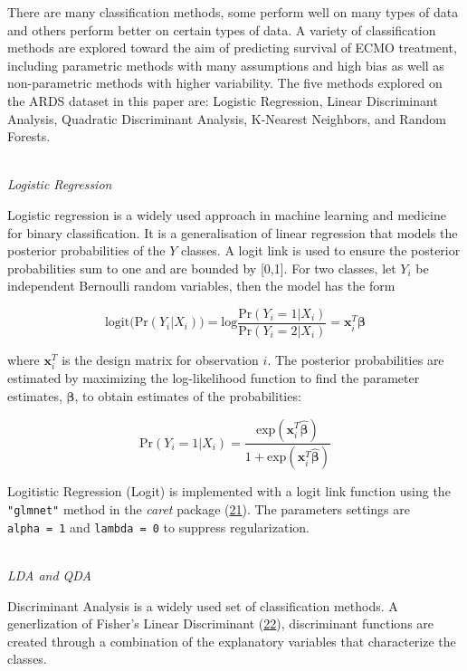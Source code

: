 \documentclass[12pt,]{article}
\begin{document}
There are many classification methods, some perform well on many types
of data and others perform better on certain types of data. A variety of
classification methods are explored toward the aim of predicting
survival of ECMO treatment, including parametric methods with many
assumptions and high bias as well as non-parametric methods with higher
variability. The five methods explored on the ARDS dataset in this paper
are: Logistic Regression, Linear Discriminant Analysis, Quadratic
Discriminant Analysis, K-Nearest Neighbors, and Random Forests.

\(~\)\\
\emph{Logistic Regression}

Logistic regression is a widely used approach in machine learning and
medicine for binary classification. It is a generalisation of linear
regression that models the posterior probabilities of the \(Y\) classes.
A logit link is used to ensure the posterior probabilities sum to one
and are bounded by {[}0,1{]}. For two classes, let \(Y_i\) be
independent Bernoulli random variables, then the model has the form

\[
\text{logit} \Big( \text{Pr}(Y_i \vert X_i) \Big) = \text{log} \frac{ \text{Pr}(Y_i=1 \vert X_i) }{ \text{Pr}(Y_i=2 \vert X_i) }  = \mathbf{x}^T_i\boldsymbol{\beta}  \tag{1}
\]

where \(\mathbf{x}^T_i\) is the design matrix for observation \(i\). The
posterior probabilities are estimated by maximizing the log-likelihood
function to find the parameter estimates, \(\hat{\boldsymbol{\beta}}\),
to obtain estimates of the probabilities:

\[
\text{Pr}(Y_i=1 \vert X_i) = \frac{ \text{exp}(\mathbf{x}^T_i \hat{\boldsymbol{\beta}}) }{ 1 + \text{exp}(\mathbf{x}^T_i \hat{\boldsymbol{\beta}}) }  \tag{2}
\]

Logitistic Regression (Logit) is implemented with a logit link function
using the \texttt{"glmnet"} method in the \emph{caret} package
(\protect\hyperlink{ref-wing_caret:_2019}{21}). The parameters settings
are \texttt{alpha\ =\ 1} and \texttt{lambda\ =\ 0} to suppress
regularization.

\(~\)\\
\emph{LDA and QDA}

Discriminant Analysis is a widely used set of classification methods. A
generlization of Fisher's Linear Discriminant
(\protect\hyperlink{ref-fisher_use_1936}{22}), discriminant functions
are created through a combination of the explanatory variables that
characterize the classes.
\end{document}
